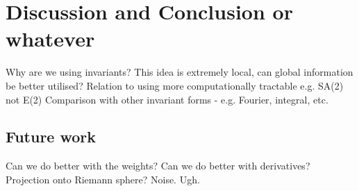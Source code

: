 \documentclass{article}
\begin{document}
\section{Discussion and Conclusion or whatever}
Why are we using invariants? 
This idea is extremely local, can global information be better utilised?
Relation to using more computationally
tractable e.g. SA(2) not E(2)
Comparison with other invariant forms - e.g. Fourier, integral, etc.

\subsection{Future work}
Can we do better with the weights?
Can we do better with derivatives?
Projection onto Riemann sphere?
Noise. Ugh.
\end{document}
